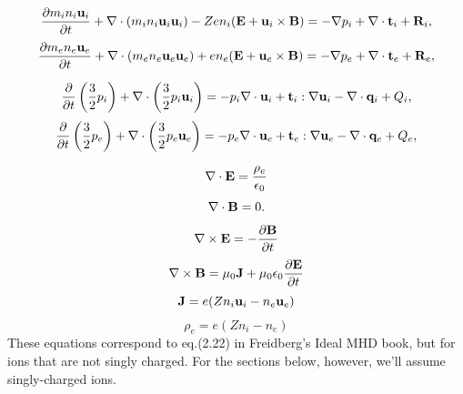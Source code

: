 \documentclass[a4paper,11pt]{report}
\begin{document}
\begin{equation}
\label{eq:twof_ui}
    \frac{\partial m_i n_i \mathbf{u}_i}{\partial t} + \nabla \cdot \left ( m_i n_i \mathbf{u}_i \mathbf{u}_i \right) - Z e n_i ( \mathbf{E} + \mathbf{u}_i \times \mathbf{B} ) = - \nabla p_i + \nabla \cdot \mathbf{t}_i + \mathbf{R}_i,
\end{equation}
\begin{equation}
\label{eq:twof_ue}
    \frac{\partial m_e n_e \mathbf{u}_e}{\partial t} + \nabla \cdot \left ( m_e n_e \mathbf{u}_e \mathbf{u}_e \right) + e n_e ( \mathbf{E} + \mathbf{u}_e \times \mathbf{B} ) = - \nabla p_e + \nabla \cdot \mathbf{t}_e + \mathbf{R}_e,
\end{equation}

\begin{equation}
\label{eq:twof_iei}
    \frac{\partial}{\partial t} \left ( \frac{3}{2} p_i \right ) + \nabla \cdot \left ( \frac{3}{2} p_i \mathbf{u}_i \right ) = -p_i \nabla \cdot \mathbf{u}_i + \mathbf{t}_i : \nabla \mathbf{u}_i - \nabla \cdot \mathbf{q}_i + Q_i,
\end{equation}
\begin{equation}
\label{eq:twof_iee}
    \frac{\partial}{\partial t} \left ( \frac{3}{2} p_e \right ) + \nabla \cdot \left ( \frac{3}{2} p_e \mathbf{u}_e \right ) = -p_e \nabla \cdot \mathbf{u}_e + \mathbf{t}_e : \nabla \mathbf{u}_e - \nabla \cdot \mathbf{q}_e + Q_e,
\end{equation}

\begin{equation}
\label{eq:twof_maxwell_3}
\nabla \cdot \mathbf{E} = \frac{\rho_e}{\epsilon_0} 
\end{equation}
\begin{equation}
\label{eq:twof_maxwell_4}
\nabla \cdot \mathbf{B} = 0.
\end{equation}
\begin{equation}
\label{eq:twof_maxwell_1}
\nabla \times \mathbf{E} = -\frac{ \partial \mathbf{B}}{\partial t}
\end{equation}
\begin{equation}
\label{eq:twof_maxwell_2}
\nabla \times \mathbf{B} = \mu_0 \mathbf{J} + \mu_0 \epsilon_0 \frac{\partial \mathbf{E}}{\partial t}
\end{equation}
\begin{equation}
\label{eq:twof_curr_density}
    \mathbf{J} = e (Z n_i \mathbf{u}_i - n_e \mathbf{u}_e)
\end{equation}
\begin{equation}
\label{eq:twof_mass_density}
    \rho_e = e (Z n_i - n_e) 
\end{equation}
These equations correspond to eq.\@ (2.22) in Freidberg's Ideal MHD book, but for ions that are not singly charged. For the sections below, however, we'll assume singly-charged ions.
\end{document}
